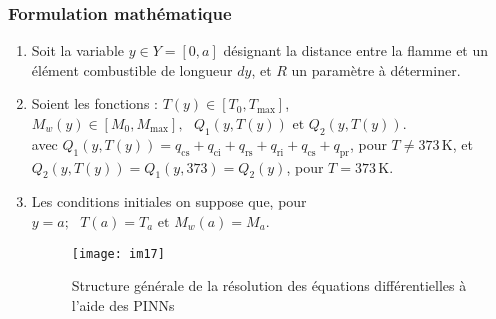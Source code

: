 \documentclass[12pt, oneside]{report} %
\theoremstyle{definition}
\theoremstyle{remark}
\begin{document}
		\subsubsection*{Formulation mathématique}
	\begin{enumerate}
		\item Soit la variable $y \in Y = \left[0, a\right]$ désignant la distance entre la flamme et un élément combustible de longueur $dy$, et $R$ un paramètre à déterminer.
		
		\item Soient les fonctions : $T(y) \in \left[ T_0, T_{\text{max}} \right] $, \text{ } $M_w(y) \in \left[M_0, M_{\text{max}}\right], \text{ }Q_1(y, T(y)) \text{ et } Q_2(y, T(y)) $. \\
		avec $Q_1(y, T(y)) = q_{\text{cs}}+ q_{\text{ci}}+q_{\text{rs}}+q_{\text{ri}}+q_{\text{cs}}+q_{\text{pr}}$, \text{ }pour $T\neq 373\, \mathrm{K}$, et \\
		$Q_2(y, T(y)) = Q_1(y, 373) = Q_2(y)$, \text{ }pour $T = 373\,   \mathrm{K}$.
		
		\item Les conditions initiales on suppose que, pour  $ y = a; \text{ } T(a) = T_a \text{ et } M_w(a) = M_a$.
	
	\begin{landscape}
		\begin{figure}
			\Huge
			\centering
			\texttt{[image: im17]}
			\caption[Structure de la résolution d'équation à l'aide des PINNs]{Structure générale de la résolution des équations différentielles à l'aide des PINNs}
			\label{fig:im17}
		\end{figure}
	\end{landscape}


\end{enumerate}
\end{document}
